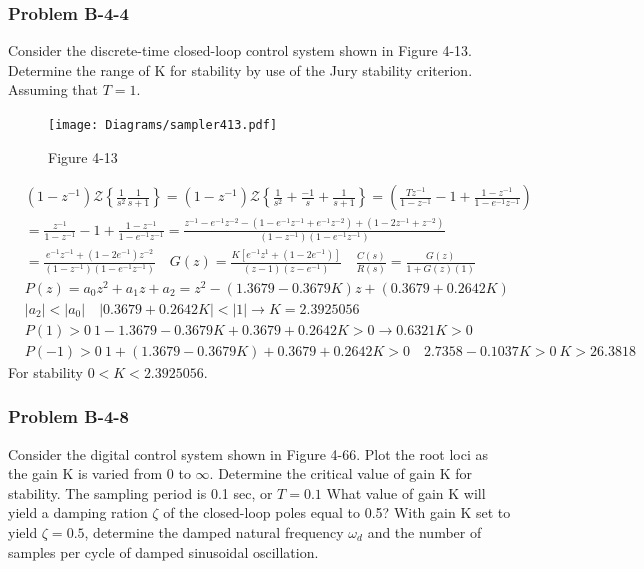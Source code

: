{\subsubsection*{Problem B-4-4}
Consider the discrete-time closed-loop control system shown in Figure 4-13. Determine
the range of K for stability by use of the Jury stability criterion. Assuming that $T=1$.

\begin{figure}[H]
	\centering
	\texttt{[image: Diagrams/sampler413.pdf]}
	\caption*{Figure 4-13}
	\label{fig:samplerblock413}
\end{figure}

\begin{align*}
&(1-z^{-1}) \mathcal{Z} \left\{ \frac{1}{s^2}\frac{1}{s+1} \right\}= (1-z^{-1}) \mathcal{Z} \left\{ \frac{1}{s^2}+\frac{-1}{s}+\frac{1}{s+1} \right\} =  \left(\frac{Tz^{-1}}{1-z^{-1}}-1+\frac{1-z^{-1}}{1-e^{-1}z^{-1}}\right) \\
& = \frac{z^{-1}}{1-z^{-1}}-1+\frac{1-z^{-1}}{1-e^{-1}z^{-1}} =\frac{z^{-1}-e^{-1}z^{-2}
	-(1-e^{-1}z^{-1}+e^{-1}z^{-2}) +(1-2z^{-1}+z^{-2}
	)}{(1-z^{-1})(1-e^{-1}z^{-1})} \\
& = \frac{e^{-1}z^{-1}+(1-2e^{-1})z^{-2}}{(1-z^{-1})(1-e^{-1}z^{-1})} \quad G(z) = \frac{K[e^{-1}z^{1}+(1-2e^{-1})]}{(z-1)(z-e^{-1})} \quad \frac{C(s)}{R(s)}=\frac{G(z)}{1+G(z)(1)} \\
& P(z)= a_0z^2+a_1z+a_2=z^2-(1.3679-0.3679K)z+(0.3679+0.2642K) \\
& |a_2| < |a_0| \quad |0.3679+0.2642K| < |1| \rightarrow K =2.3925056 \\
& P(1) > 0 \ 1-1.3679-0.3679K + 0.3679+0.2642K > 0 \rightarrow 0.6321K > 0 \\
& P(-1) > 0 \ 1+(1.3679-0.3679K)+0.3679+0.2642K > 0 \quad 2.7358-0.1037K > 0 \ K > 26.3818
\end{align*}
For stability $0 < K < 2.3925056$.

\subsubsection*{Problem B-4-8}
Consider the digital control system shown in Figure 4-66. Plot the root loci as the gain K is varied from $0$ to $\infty$. Determine the critical value of gain K for stability. The sampling period is 0.1 sec, or $T=0.1$ What value of gain K will yield a damping ration $\zeta$ of the closed-loop poles equal to 0.5? With gain K set to yield $\zeta=0.5$, determine the damped natural frequency $\omega_d$ and the number of samples per cycle of damped sinusoidal oscillation.

}
